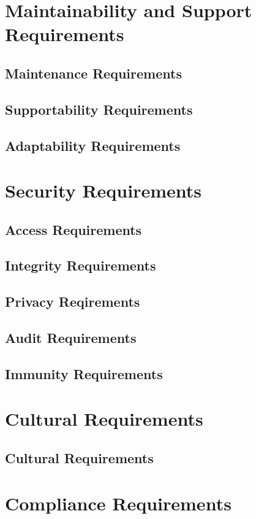 \documentclass[]{article}
\begin{document}
\section{Maintainability and Support Requirements}
\subsection{Maintenance Requirements}
\subsection{Supportability Requirements}
\subsection{Adaptability Requirements}

\section{Security Requirements}
\subsection{Access Requirements}
\subsection{Integrity Requirements}
\subsection{Privacy Reqirements}
\subsection{Audit Requirements}
\subsection{Immunity Requirements}

\section{Cultural Requirements}
\subsection{Cultural Requirements}

\section{Compliance Requirements}
\end{document}
